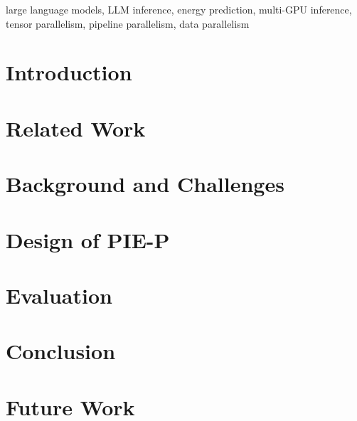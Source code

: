 \documentclass[conference]{IEEEtran}
\newcommand{\sys}{PIE-P}
\begin{document}
\begin{IEEEkeywords}
large language models, LLM inference, energy prediction, multi-GPU inference,
tensor parallelism, pipeline parallelism, data parallelism
\end{IEEEkeywords}

\section{Introduction}
\label{s:introduction}


\section{Related Work}
\label{s:related}


\section{Background and Challenges}
\label{s:challenges}


\section{Design of \sys{}}
\label{s:piep}


\section{Evaluation}
\label{s:evaluation}


\section{Conclusion}
\label{s:conclusion}


\section{Future Work}
\label{s:future-work}





% 
\end{document}
